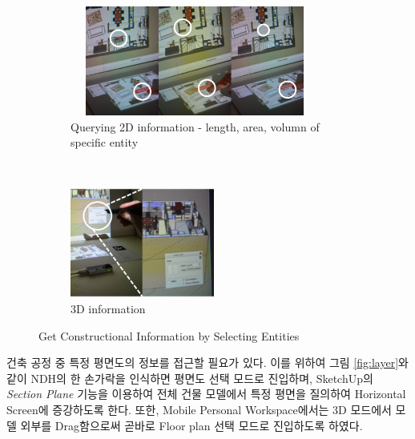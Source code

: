 \begin{figure}[h!]
	\centering
        \begin{subfigure}[b]{1.0\columnwidth}
	        \centering
                \includegraphics[width=0.9\textwidth, height=3.6cm]{4-Interaction_Design/2d_info}
                \caption{Querying 2D information - length, area, volumn of specific entity}
                \label{fig:2d_info}
        \end{subfigure}%
        \\
        \begin{subfigure}[b]{1.0\columnwidth}
            \centering
            \includegraphics[width=0.7\columnwidth, height=3.6cm]{4-Interaction_Design/3d_info_1}
                \caption{3D information}
                \label{fig:3d_info}
        \end{subfigure}
	\caption{Get Constructional Information by Selecting Entities}
    \label{fig:infor}
\end{figure}


건축 공정 중 특정 평면도의 정보를 접근할 필요가 있다. 이를 위하여 그림 \ref{fig:layer}와 같이 NDH의 한 손가락을 인식하면 평면도 선택 모드로 진입하며, SketchUp의 \textit{Section Plane} 기능을 이용하여 전체 건물 모델에서 특정 평면을 질의하여 Horizontal Screen에 증강하도록 한다. 또한, Mobile Personal Workspace에서는 3D 모드에서 모델 외부를 Drag함으로써 곧바로 Floor plan 선택 모드로 진입하도록 하였다.



